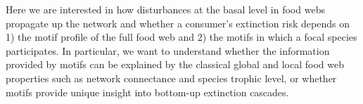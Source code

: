\documentclass[12pt]{article}
\begin{document}
\begin{spacing}{2.0}
    
    

    Here we are interested in how disturbances at the basal level in food webs propagate up the network and whether a consumer's extinction risk depends on 1) the motif profile of the full food web and 2) the motifs in which a focal species participates. In particular, we want to understand whether the information provided by motifs can be explained by the classical global and local food web properties such as network connectance and species trophic level, or whether motifs provide unique insight into bottom-up extinction cascades.
  

\end{spacing}
\end{document}
